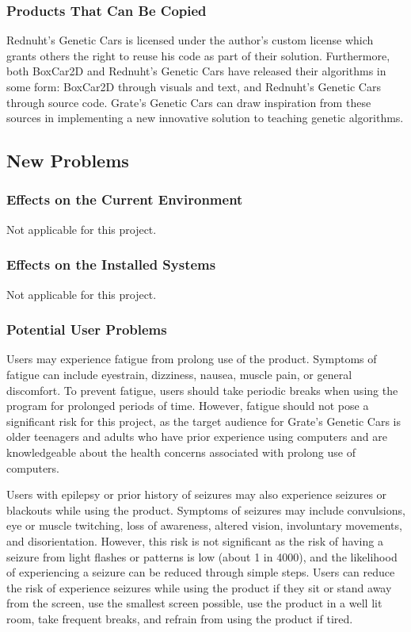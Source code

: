 \documentclass[12pt, titlepage]{article}
\begin{document}
\subsubsection{Products That Can Be Copied}
Rednuht's Genetic Cars is licensed under the author's custom license which 
grants others the right to reuse his code as part of their solution. 
Furthermore, both BoxCar2D and Rednuht's Genetic Cars have released their 
algorithms in some form: BoxCar2D through visuals and text, and Rednuht's 
Genetic Cars through source code. Grate's Genetic Cars can draw inspiration from 
these sources in implementing a new innovative solution to teaching genetic 
algorithms.

\subsection{New Problems}

\subsubsection{Effects on the Current Environment}
Not applicable for this project.

\subsubsection{Effects on the Installed Systems}
Not applicable for this project.

\subsubsection{Potential User Problems}
Users may experience fatigue from prolong use of the product. Symptoms of fatigue can include eyestrain, dizziness, nausea, muscle pain, or general discomfort. To prevent fatigue, users should take periodic breaks when using the program for prolonged periods of time. However, fatigue should not pose a significant risk for this project, as the target audience for Grate's Genetic Cars is older teenagers and adults who have prior experience using computers and are  knowledgeable about the health concerns associated with prolong use of computers.

Users with epilepsy or prior history of seizures may also experience seizures or blackouts while using the product. Symptoms of seizures may include convulsions, eye or muscle twitching, loss of awareness, altered vision, involuntary movements, and disorientation. However, this risk is not significant as the risk of having a seizure from light flashes or patterns is low (about 1 in 4000), and the likelihood of experiencing a seizure can be reduced through simple steps. Users can reduce the risk of experience seizures while using the product if they sit or stand away from the screen, use the smallest screen possible, use the product in a well lit room, take frequent breaks, and refrain from using the product if tired.
\end{document}
